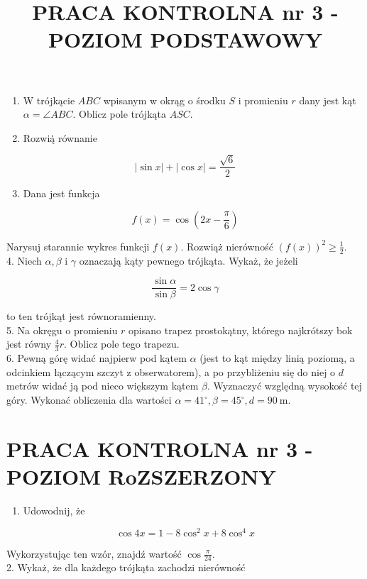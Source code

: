 \documentclass[10pt]{article}
\title{PRACA KONTROLNA nr 3 - POZIOM PODSTAWOWY }
\author{}
\date{}
\begin{document}
\maketitle
\begin{enumerate}
  \item W trójkącie $A B C$ wpisanym w okrąg o środku $S$ i promieniu $r$ dany jest kąt $\alpha=\angle A B C$. Oblicz pole trójkąta $A S C$.
  \item Rozwią̇̇ równanie
\end{enumerate}

$$
|\sin x|+|\cos x|=\frac{\sqrt{6}}{2}
$$

\begin{enumerate}
  \setcounter{enumi}{2}
  \item Dana jest funkcja
\end{enumerate}

$$
f(x)=\cos \left(2 x-\frac{\pi}{6}\right)
$$

Narysuj starannie wykres funkcji $f(x)$. Rozwiąż nierówność $(f(x))^{2} \geqslant \frac{1}{2}$.\\
4. Niech $\alpha, \beta$ i $\gamma$ oznaczają kąty pewnego trójkąta. Wykaż, że jeżeli

$$
\frac{\sin \alpha}{\sin \beta}=2 \cos \gamma
$$

to ten trójkąt jest równoramienny.\\
5. Na okręgu o promieniu $r$ opisano trapez prostokątny, którego najkrótszy bok jest równy $\frac{4}{3} r$. Oblicz pole tego trapezu.\\
6. Pewną górę widać najpierw pod kątem $\alpha$ (jest to kąt między linią poziomą, a odcinkiem łączącym szczyt z obserwatorem), a po przybliżeniu się do niej o $d$ metrów widać ją pod nieco większym kątem $\beta$. Wyznaczyć względną wysokość tej góry. Wykonać obliczenia dla wartości $\alpha=41^{\circ}, \beta=45^{\circ}, d=90 \mathrm{~m}$.

\section*{PRACA KONTROLNA nr 3 - POZIOM RoZSZERZONY}
\begin{enumerate}
  \item Udowodnij, że
\end{enumerate}

$$
\cos 4 x=1-8 \cos ^{2} x+8 \cos ^{4} x
$$

Wykorzystując ten wzór, znajdź wartość $\cos \frac{\pi}{24}$.\\
2. Wykaż, że dla każdego trójkąta zachodzi nierówność
\end{document}
